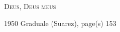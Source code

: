 \documentclass[10pt, letterpaper]{article}
\begin{document}
\newcommand{\red}[1]{\textcolor{red}{#1}}

\begin{center}\begin{huge}\textsc{Deus, Deus meus}\end{huge}\end{center}
\begin{center}1950 Graduale (Suarez), page(s) 153\end{center}


\def\greinitialformat#1{%
{\fontsize{31}{31}\selectfont #1}%
}

\gresetfirstlineaboveinitial{\small \textbf{}}{\small \textbf{}}
\commentary{{\small \emph{}}}

\grespaceabovelines=3mm

\end{document}
